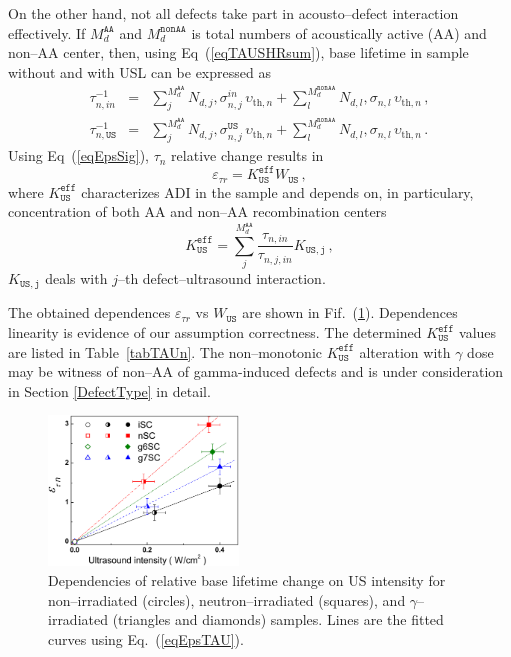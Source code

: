 \documentclass[aip,jap, amsmath,amssymb,reprint]{revtex4-1}
\begin{document}
On the other hand, not all defects take part in acousto--defect interaction effectively.
If  $M_d^\mathtt{AA}$ and $M_d^\mathtt{nonAA}$ is total numbers of acoustically active (AA) and non--AA center,
then, using Eq~(\ref{eqTAUSHRsum}), base lifetime in sample without and with USL can be expressed as
\begin{eqnarray}
\tau_{n,in}^{-1}&=&\sum_j^{M_d^\mathtt{AA}}N_{d,j},\sigma_{n,j}^{in}\,\upsilon_{\mathrm{th},n}+
\sum_l^{M_d^\mathtt{nonAA}}N_{d,l},\sigma_{n,l}\,\upsilon_{\mathrm{th},n}\,,\nonumber\\
\tau_{n,\mathtt{US}}^{-1}&=&\sum_j^{M_d^\mathtt{AA}}N_{d,j},\sigma_{n,j}^\mathtt{US}\,\upsilon_{\mathrm{th},n}+
\sum_l^{M_d^\mathtt{nonAA}}N_{d,l},\sigma_{n,l}\,\upsilon_{\mathrm{th},n}\,.\nonumber
\end{eqnarray}
Using Eq~(\ref{eqEpsSig}), $\tau_n$ relative change results in
\begin{equation}
\label{eqEpsTAU}
\varepsilon_{\tau r}=K_\mathtt{US}^\mathtt{eff}W_\mathtt{US}\,,
\end{equation}
where $K_\mathtt{US}^\mathtt{eff}$ characterizes ADI in the sample
and depends on, in particulary, concentration of both AA and non--AA recombination centers
\begin{equation}
\label{eqKeff}
K_\mathtt{US}^\mathtt{eff}=\sum_j^{M_d^\mathtt{AA}}\frac{\tau_{n,in}}{\tau_{n,j,in}}K_\mathtt{US,j}\,,
\end{equation}
$K_\mathtt{US,j}$ deals with $j$--th defect--ultrasound interaction.

The obtained dependences $\varepsilon_{\tau r}$ vs $W_\mathtt{US}$ are shown in Fif.~(\ref{fig_Kus}).
Dependences linearity is evidence of our assumption correctness.
The determined $K_\mathtt{US}^\mathtt{eff}$ values are listed in Table~\ref{tabTAUn}.
The non--monotonic $K_\mathtt{US}^\mathtt{eff}$ alteration with $\gamma$ dose may be witness of non--AA of gamma-induced defects and
is under consideration in Section \ref{DefectType} in detail.

\begin{figure}
\includegraphics[width=0.45\textwidth]{olikhFig7}%
\caption{\label{fig_Kus}
Dependencies of relative base lifetime change on US intensity for non--irradiated (circles), neutron--irradiated (squares), and $\gamma$--irradiated
(triangles and diamonds) samples.
Lines are the fitted curves using Eq.~(\ref{eqEpsTAU}).
}%
\end{figure}
\end{document}
